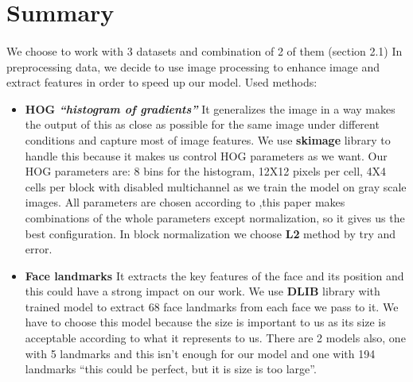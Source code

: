 \documentclass{article}
\begin{document}
\section{Summary}
\paragraph{}
We choose to work with 3 datasets and combination of 2 of them (section 2.1) \newline
In preprocessing data, we decide to use image processing to enhance image and extract features in order to speed up our model. \newline
Used methods: \newline
\begin{itemize}
\item \textbf{HOG \textit{“histogram of gradients”} }
\newline It generalizes the image in a way makes the output of this as close as possible for the same image under different conditions and capture most of image features. 
\newline We use \textbf{skimage} library to handle this because it makes us control HOG parameters as we want. 
\newline Our HOG parameters are: 8 bins for the histogram, 12X12 pixels per cell, 4X4 cells per block with disabled multichannel as we train the model on gray scale images. 
\newline All parameters are chosen according to \cite{hog},this paper makes combinations of the whole parameters except normalization, so it gives us the best configuration.
\newline
In block normalization we choose \textbf{L2} method by try and error.
\item \textbf{Face landmarks }
\newline It extracts the key features of the face and its position and this could have a strong impact on our work. 
\newline We use \textbf{DLIB} library with trained model to extract 68 face landmarks from each face we pass to it. 
\newline We have to choose this model because the size is important to us as its size is acceptable according to what it represents to us. 
\newline There are 2 models also, one with 5 landmarks and this isn’t enough for our model and one with 194 landmarks “this could be perfect, but it is size is too large”.
\end{itemize}
\end{document}
